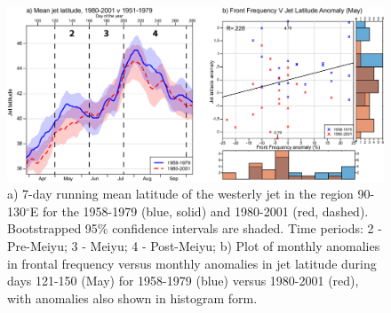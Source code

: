 \documentclass[draft,grl]{AGUTeX}
\begin{document}
\begin{figure}[htbp]
\begin{center}
\includegraphics[width=36pc]{Figures/jet}
\caption{a) 7-day running mean latitude of the westerly jet in the region 90-130$^\circ$E for the 1958-1979 (blue, solid) and 1980-2001 (red, dashed). Bootstrapped 95\% confidence intervals are shaded. Time periods: 2 - Pre-Meiyu; 3 - Meiyu; 4 - Post-Meiyu; b) Plot of monthly anomalies in frontal frequency versus monthly anomalies in jet latitude during days 121-150 (May) for 1958-1979 (blue) versus 1980-2001 (red), with anomalies also shown in histogram form.}
\label{jet_seasonal}
\end{center}
\end{figure}
\end{document}
